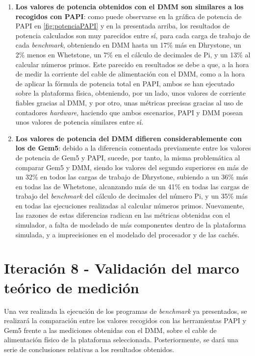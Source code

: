 \begin{enumerate}%
    \item \textbf{Los valores de potencia obtenidos con el DMM son similares a los recogidos con PAPI}: como puede observarse en la gráfica de potencia de PAPI en \ref{fig:potenciaPAPI} y en la presentada arriba, los resultados de potencia calculados son muy parecidos entre sí, para cada carga de trabajo de cada \textit{benchmark}, obteniendo en DMM hasta un 17\% más en Dhrystone, un 2\% menos en Whetstone, un 7\% en el cálculo de decimales de Pi, y un 13\% al calcular números primos. Este parecido en resultados se debe a que, a la hora de medir la corriente del cable de alimentación con el DMM, como a la hora de aplicar la fórmula de potencia total en PAPI, ambos se han ejecutado sobre la plataforma física, obteniendo, por un lado, unos valores de corriente fiables gracias al DMM, y por otro, unas métricas precisas gracias al uso de contadores \textit{hardware}, haciendo que ambos escenarios, PAPI y DMM posean unos valores de potencia similares entre sí. 
    \item \textbf{Los valores de potencia del DMM difieren considerablemente con los de Gem5}: debido a la diferencia comentada previamente entre los valores de potencia de Gem5 y PAPI, sucede, por tanto, la misma problemática al comparar Gem5 y DMM, siendo los valores del segundo superiores en más de un 32\% en todos las cargas de trabajo de Dhrystone, subiendo a un 36\% más en todas las de Whetstone, alcanzando más de un 41\% en todas las cargas de trabajo del \textit{benchmark} del cálculo de decimales del número Pi, y un 35\% más en todas las ejecuciones realizadas al calcular números primos. Nuevamente, las razones de estas diferencias radican en las métricas obtenidas con el simulador, a falta de modelado de más componentes dentro de la plataforma simulada, y a imprecisiones en el modelado del procesador y de las cachés.
\end{enumerate}

\section{Iteración 8 - Validación del marco teórico de medición}

Una vez realizada la ejecución de los programas de \textit{benchmark} ya presentados, se realizará la comparación entre los valores recogidos con las herramientas \ac{PAPI} y Gem5 frente a las mediciones obtenidas con el DMM, sobre el cable de alimentación físico de la plataforma seleccionada. Posteriormente, se dará una serie de conclusiones relativas a los resultados obtenidos.

